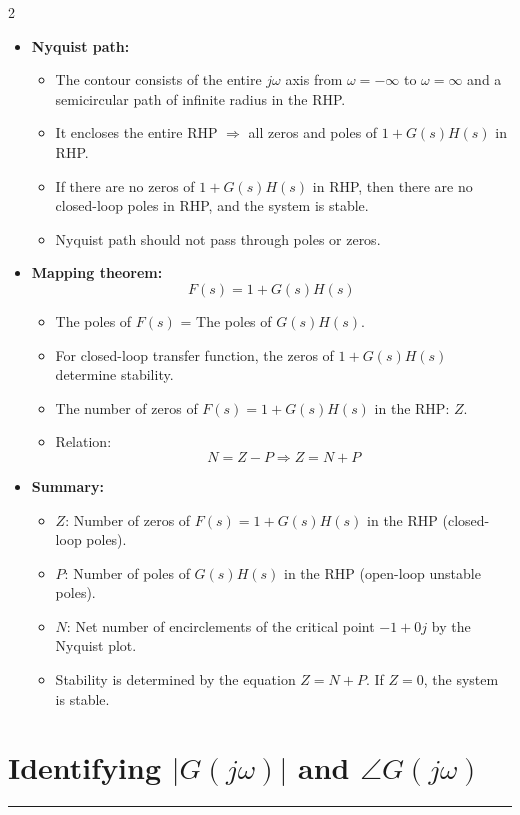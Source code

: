\documentclass[letterpaper,10pt]{article}
\let\oldsection\section
\renewcommand{\section}[1]{%
\vspace{-1em}
  \oldsection{#1}%
  \par\vspace{-2em}%
  \noindent\rule{0.5\textwidth}{0.5pt}%
  \vspace{0em}%
}
\begin{document}
\begin{multicols}{2}
\begin{itemize}
    \item \textbf{Nyquist path:}
    \begin{itemize}
        \item The contour consists of the entire $j\omega$ axis from $\omega = -\infty$ to $\omega = \infty$ and a semicircular path of infinite radius in the RHP.
        \item It encloses the entire RHP $\Rightarrow$ all zeros and poles of $1 + G(s)H(s)$ in RHP.
        \item If there are no zeros of $1 + G(s)H(s)$ in RHP, then there are no closed-loop poles in RHP, and the system is stable.
        \item Nyquist path should not pass through poles or zeros.
    \end{itemize}
    \item \textbf{Mapping theorem:}
    \[
    F(s) = 1 + G(s)H(s)
    \]
    \begin{itemize}
        \item The poles of $F(s)$ = The poles of $G(s)H(s)$.
        \item For closed-loop transfer function, the zeros of $1 + G(s)H(s)$ determine stability.
        \item The number of zeros of $F(s) = 1 + G(s)H(s)$ in the RHP: $Z$.
        \item Relation:
        \[
        N = Z - P \Rightarrow Z = N + P
        \]
        \end{itemize}
    \item \textbf{Summary:} 
        \begin{itemize}
            \item \( Z \): Number of zeros of \( F(s) = 1 + G(s)H(s) \) in the RHP (closed-loop poles).
            \item \( P \): Number of poles of \( G(s)H(s) \) in the RHP (open-loop unstable poles).
            \item \( N \): Net number of encirclements of the critical point \( -1 + 0j \) by the Nyquist plot.
            \item Stability is determined by the equation \( Z = N + P \). If \( Z = 0 \), the system is stable.
        \end{itemize}
    
\end{itemize}

\section{Identifying \( |G(j\omega)| \) and \( \angle G(j\omega) \)}


\end{multicols}
\end{document}
